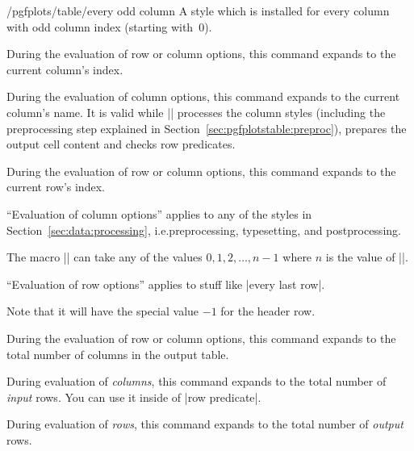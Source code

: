 \begin{stylekey}{/pgfplots/table/every odd column}
    A style which is installed for every column with odd column index (starting
    with~$0$).
\end{stylekey}

\begin{command}{\pgfplotstablecol}
    During the evaluation of row or column options, this command expands to the
    current column's index.
\end{command}

\begin{command}{\pgfplotstablecolname}
    During the evaluation of column options, this command expands to the
    current column's name. It is valid while |\pgfplotstabletypeset| processes
    the column styles (including the preprocessing step explained in
    Section~\ref{sec:pgfplotstable:preproc}), prepares the output cell content
    and checks row predicates.
\end{command}

\begin{command}{\pgfplotstablerow}
\label{pgfplotstable:page:tablerow}
    During the evaluation of row or column options, this command expands to the
    current row's index.

    ``Evaluation of column options'' applies to any of the styles in
    Section~\ref{sec:data:processing}, i.e.\@ preprocessing, typesetting, and
    postprocessing.

    The macro |\pgfplotstablerow| can take any of the values $0,1,2,\dotsc,n-1$
    where $n$ is the value of |\pgfplotstablerows|.

    ``Evaluation of row options'' applies to stuff like |every last row|.

    Note that it will have the special value $-1$ for the header row.
\end{command}

\begin{command}{\pgfplotstablecols}
    During the evaluation of row or column options, this command expands to the
    total number of columns in the output table.
\end{command}

\begin{command}{\pgfplotstablerows}
    During evaluation of \emph{columns}, this command expands to the total
    number of \emph{input} rows. You can use it inside of |row predicate|.

    During evaluation of \emph{rows}, this command expands to the total number
    of \emph{output} rows.
\end{command}

